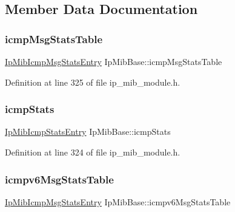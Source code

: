 \subsection{Member Data Documentation}
\mbox{\label{structIpMibBase_a7954b02fb27ef8916d73dd9c88db4f96}} 
\subsubsection{\texorpdfstring{icmp\+Msg\+Stats\+Table}{icmpMsgStatsTable}}
{\footnotesize\ttfamily \hyperlink{structIpMibIcmpMsgStatsEntry}{Ip\+Mib\+Icmp\+Msg\+Stats\+Entry} Ip\+Mib\+Base\+::icmp\+Msg\+Stats\+Table}



Definition at line 325 of file ip\+\_\+mib\+\_\+module.\+h.

\mbox{\label{structIpMibBase_a8dc95143f16af236a35dbe5660727660}} 
\subsubsection{\texorpdfstring{icmp\+Stats}{icmpStats}}
{\footnotesize\ttfamily \hyperlink{structIpMibIcmpStatsEntry}{Ip\+Mib\+Icmp\+Stats\+Entry} Ip\+Mib\+Base\+::icmp\+Stats}



Definition at line 324 of file ip\+\_\+mib\+\_\+module.\+h.

\mbox{\label{structIpMibBase_a49b1f93d0a10fafa8c2e380d356ee87b}} 
\subsubsection{\texorpdfstring{icmpv6\+Msg\+Stats\+Table}{icmpv6MsgStatsTable}}
{\footnotesize\ttfamily \hyperlink{structIpMibIcmpMsgStatsEntry}{Ip\+Mib\+Icmp\+Msg\+Stats\+Entry} Ip\+Mib\+Base\+::icmpv6\+Msg\+Stats\+Table}



